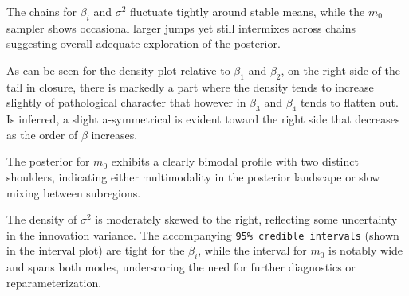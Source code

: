 \documentclass{Configuration_Files/PoliMi3i_thesis}
\begin{document}
The chains for \(\beta_i\) and \(\sigma^2\) fluctuate tightly around stable means, while the \(m_0\) sampler shows occasional larger jumps yet still intermixes across chains suggesting overall adequate exploration of the posterior.

As can be seen for the density plot relative to  \(\beta_1\) and \(\beta_2\), on the right side of the tail in closure, there is markedly a part where the density tends to increase slightly of pathological character that however in \(\beta_3\) and \(\beta_4\) tends to flatten out. Is inferred, a slight a-symmetrical is evident toward the right side that decreases as the order of \(\beta\) increases.  


The posterior for \(m_0\) exhibits a clearly bimodal profile with two distinct shoulders, indicating either multimodality in the posterior landscape or slow mixing between subregions.  

The density of \(\sigma^2\) is moderately skewed to the right, reflecting some uncertainty in the innovation variance.  The accompanying \texttt{95\% credible intervals} (shown in the interval plot) are tight for the \(\beta_i\), while the interval for \(m_0\) is notably wide and spans both modes, underscoring the need for further diagnostics or reparameterization.
\end{document}
